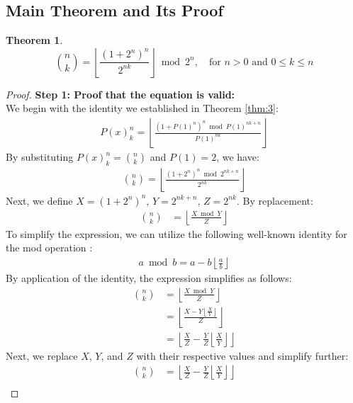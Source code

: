 \documentclass{article}
\theoremstyle{plain}
\newtheorem{thm}{Theorem}
\begin{document}
\subsection{Main Theorem and Its Proof}

\begin{thm}
\label{thm:4}
\begin{equation}
\binom{n}{k} = \left\lfloor\frac{(1 + 2^{n})^{n}}{2^{n k}}\right\rfloor \bmod{2^{n}}, \quad \text{for } n > 0 \text{ and } 0 \leq k \leq n
\end{equation}
\end{thm}
\begin{proof}
\textbf{Step 1: Proof that the equation is valid:} \\
We begin with the identity we established in Theorem \ref{thm:3}:
\begin{align}
 P(x)^{n}_{k} = \left\lfloor\frac{(1 + P(1)^{n})^{n} \bmod P(1)^{n k + n}}{P(1)^{n k}}\right\rfloor
\end{align}
By substituting $P(x)^{n}_{k} = \binom{n}{k}$ and $P(1) = 2$, we have: 
\begin{align}
\binom{n}{k} = \left\lfloor\frac{(1 + 2^{n})^{n} \bmod 2^{n k + n}}{2^{n k}}\right\rfloor
\end{align}
Next, we define $X = (1 + 2^{n})^{n}$, $Y = 2^{n k + n}$, $Z = 2^{n k}$. By replacement:
\begin{align}
\binom{n}{k} &= \left\lfloor\frac{X \bmod Y}{Z}\right\rfloor
\end{align}
To simplify the expression, we can utilize the following well-known identity for the mod operation \cite{niven2008introduction}:
\begin{align}
\label{modidentity}
a \bmod{b} = a - b \left\lfloor \frac{a}{b} \right\rfloor
\end{align}
By application of the identity, the expression simplifies as follows:
\begin{align}
\binom{n}{k} &= \left\lfloor\frac{X \bmod Y}{Z}\right\rfloor\\ &= \left\lfloor\frac{X - Y \left\lfloor \frac{X}{Y} \right\rfloor}{Z}\right\rfloor\\ &= \left\lfloor\frac{X}{Z} - \frac{Y}{Z} \left\lfloor \frac{X}{Y} \right\rfloor\right\rfloor
\end{align}
Next, we replace $X$, $Y$, and $Z$ with their respective values and simplify further:
\begin{align}
\binom{n}{k} &= \left\lfloor\frac{X}{Z} - \frac{Y}{Z} \left\lfloor \frac{X}{Y} \right\rfloor\right\rfloor \\ 

\end{align}
\end{proof}
\end{document}
